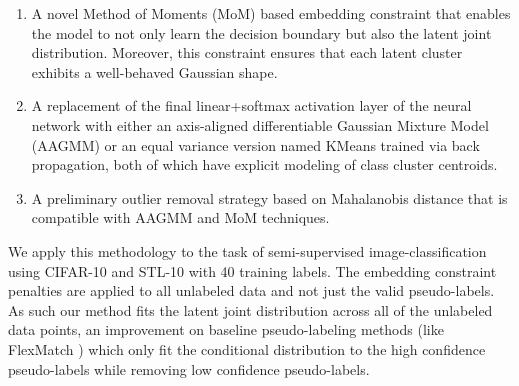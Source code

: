 \documentclass[10pt,twocolumn,letterpaper]{article}
\begin{document}
\begin{enumerate}
	\item A novel Method of Moments (MoM) based embedding constraint that enables the model to not only learn the decision boundary but also the latent joint distribution. 
	Moreover, this constraint ensures that each latent cluster exhibits a well-behaved Gaussian shape.
	\item A replacement of the final linear+softmax activation layer of the neural network with either an axis-aligned differentiable Gaussian Mixture Model (AAGMM) or an equal variance version named KMeans trained via back propagation, both of which have explicit modeling of class cluster centroids. 
	\item A preliminary outlier removal strategy based on Mahalanobis distance that is compatible with AAGMM and MoM techniques.
\end{enumerate}

We apply this methodology to the task of semi-supervised image-classification using CIFAR-10 \cite{cifar10} and STL-10 \cite{coates2011analysis} with 40 training labels. 
The embedding constraint penalties are applied to all unlabeled data and not just the valid pseudo-labels.  
As such our method fits the latent joint distribution across all of the unlabeled data points, an improvement on baseline pseudo-labeling methods (like FlexMatch \cite{zhang2021flexmatch}) which only fit the conditional distribution to the high confidence pseudo-labels while removing low confidence pseudo-labels.
\end{document}
